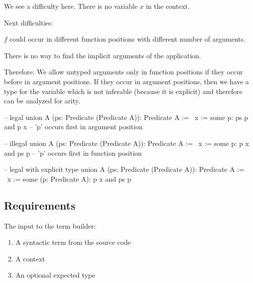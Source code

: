 We see a difficulty here. There is no variable $x$ in the context.

\noindent Next difficulties:

$f$ could occur in different function positions with
different number of arguments.

There is no way to find the implicit arguments of the application.

Therefore: We allow untyped arguments only in function positions if they occur
before in argument positions. If they occur in argument positions, then we
have a type for the variable which is not inferable (because it is explicit)
and therefore can be analyzed for arity.


\begin{alba}
  -- legal
  union A (ps: Predicate (Predicate A)): Predicate A :=
    \ x := some p: ps p and p x  -- 'p' occurs first in argument position

  -- illegal
  union A (ps: Predicate (Predicate A)): Predicate A :=
    \ x := some p: p x and ps p   -- 'p' occurs first in function position

  -- legal with explicit type
  union A (ps: Predicate (Predicate A)): Predicate A :=
    \ x := some (p: Predicate A): p x and ps p
\end{alba}









%


\subsection{Requirements}

The input to the term builder:
%
\begin{enumerate}

\item A syntactic term from the source code

\item A context

\item An optional expected type
\end{enumerate}

